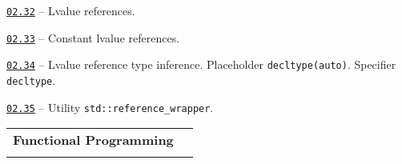 \documentclass[a4paper,12pt]{article}
\renewenvironment{itemize}
{
    \begin{list}{\labelitemi}
    {
      \setlength{\topsep}{0pt}
      \setlength{\partopsep}{0pt}
      \setlength{\parskip}{0pt}
      \setlength{\itemsep}{0pt}
      \setlength{\parsep}{0pt}
      \setlength{\leftmargin}{14.5pt}
    }
}{\end{list}}
\begin{document}
\medskip\smallskip

\begin{itemize}

    \item \href{https://github.com/i-s-m-mipt/Education/blob/master/projects/examples/source/02.32.cpp}{\texttt{02.32}} -- Lvalue references.

    \smallskip

    \item \href{https://github.com/i-s-m-mipt/Education/blob/master/projects/examples/source/02.33.cpp}{\texttt{02.33}} -- Constant lvalue references.

    \smallskip

    \item \href{https://github.com/i-s-m-mipt/Education/blob/master/projects/examples/source/02.34.cpp}{\texttt{02.34}} -- Lvalue reference type inference. Placeholder \lstinline{decltype(auto)}. Specifier \lstinline{decltype}.

    \smallskip

    \item \href{https://github.com/i-s-m-mipt/Education/blob/master/projects/examples/source/02.35.cpp}{\texttt{02.35}} -- Utility \lstinline{std::reference_wrapper}.

\end{itemize}

\bigskip\medskip

\begin{tabular}{!{\vrule width 1pt}L{4.9cm}!{\vrule width 1pt}L{14.1cm}!{\vrule width 0pt}} 


\textbf{Functional Programming} & \\


\end{tabular}

\medskip\smallskip
\end{document}
